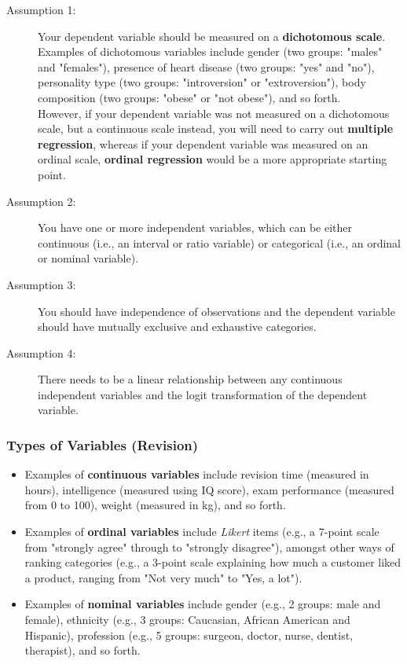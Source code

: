 \documentclass[12pt]{article}
\begin{document}
\begin{description}
	\item[Assumption 1:] Your dependent variable should be measured on a \textbf{dichotomous scale}. Examples of dichotomous variables include gender (two groups: "males" and "females"), presence of heart disease (two groups: "yes" and "no"), personality type (two groups: "introversion" or "extroversion"), body composition (two groups: "obese" or "not obese"), and so forth. \\
	\newline
	However, if your dependent variable was not measured on a dichotomous scale, but a continuous scale instead, you will need to carry out \textbf{multiple regression}, whereas if your dependent variable was measured on an ordinal scale, \textbf{ordinal regression} would be a more appropriate starting point.
	
	\item[Assumption 2:] You have one or more independent variables, which can be either continuous (i.e., an interval or ratio variable) or categorical (i.e., an ordinal or nominal variable). 
	
	
	
	\item[Assumption 3:] You should have independence of observations and the dependent variable should have mutually exclusive and exhaustive categories.
	
	\item[Assumption 4:] There needs to be a linear relationship between any continuous independent variables and the logit transformation of the dependent variable. 
\end{description}
\begin{framed}
	\newpage
	\subsubsection*{Types of Variables (Revision)}
	\begin{itemize}
		\item Examples of \textbf{continuous variables} include revision time (measured in hours), intelligence (measured using IQ score), exam performance (measured from 0 to 100), weight (measured in kg), and so forth. 
		
		\item Examples of \textbf{ordinal variables} include \textit{Likert} items (e.g., a 7-point scale from "strongly agree" through to "strongly disagree"), amongst other ways of ranking categories (e.g., a 3-point scale explaining how much a customer liked a product, ranging from "Not very much" to "Yes, a lot"). 
		\item Examples of \textbf{nominal variables} include gender (e.g., 2 groups: male and female), ethnicity (e.g., 3 groups: Caucasian, African American and Hispanic), profession (e.g., 5 groups: surgeon, doctor, nurse, dentist, therapist), and so forth.
	\end{itemize}
\end{framed}
\end{document}

